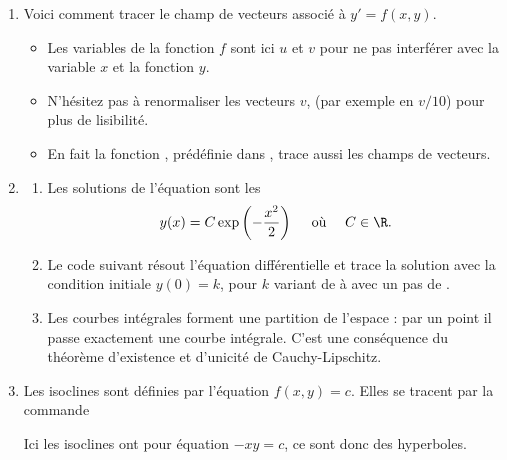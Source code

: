 \documentclass[class=report,crop=false]{standalone}
\begin{document}
\begin{enumerate}
  \item Voici comment tracer le champ de vecteurs associé à $y' = f(x,y)$.
  
  
  \begin{itemize}
    \item Les variables de la fonction $f$ sont ici $u$ et $v$ pour ne pas interférer avec
  la variable $x$ et la fonction $y$.
  
    \item N'hésitez pas à renormaliser les vecteurs $v$, (par exemple en $v/10$) pour plus de lisibilité. 
  
    \item  En fait la fonction , prédéfinie dans \Sage, trace aussi les champs de
  vecteurs.
  \end{itemize}

  
 
 
  
  \item 
  \begin{enumerate}
    \item Les solutions de l'équation sont les
    $$y(x) = C \exp\left(-\frac{x^2}{2}\right) \quad \text{ où } \quad C \in \R.$$
    
    \item Le code suivant résout l'équation différentielle et trace la solution 
    avec la condition initiale $y(0)=k$, pour $k$ variant de  à 
    avec un pas de .
    
    
    \item Les courbes intégrales forment une partition 
de l'espace : par un point il passe exactement une courbe intégrale. C'est 
une conséquence du théorème d'existence et d'unicité de Cauchy-Lipschitz. 

  \end{enumerate}
  \item Les isoclines sont définies par l'équation $f(x,y) = c$.
  Elles se tracent par la commande \\
  \centerline{}
  
  Ici les isoclines ont pour équation $-xy=c$, ce sont donc des hyperboles.
  
\end{enumerate}
\end{document}
